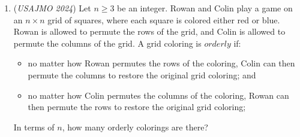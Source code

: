 \begin{enumerate}
 
Now, consider the case where there is some prime $p>2$ such that there are no even integers $m$ such that $p|a(m)$.

 Lemma $2$:

 In this case, we must have that $p|a(m)$ if $m\equiv -1 \mod p-1$ for all integers $m$.

 Proof of Lemma $2$:

 Suppose for the sake of contradiction that there exists some $m$ such that $m\equiv -1\mod p-1$ and $p$ does not divide $a(m)$. Then, we have $a(m+1)\equiv (a(m))^{m+1}-1\equiv 1-1\equiv 0\mod p$, by Fermat's Little Theorem. Since for all $p>2$, $p-1$ is even, then $m+1$ would be even. However this results in a contradiction.

 Then, we get that if $m\equiv -1\mod p-1$, then $0\equiv a(m)\equiv (a(m-1))^m-1\mod p\implies (a(m-1))^{m+1}\equiv 1\equiv a(m-1)\mod p$.

 Then, by LTE, $v_p(a(m))=v_p((a(m-1))^m-1)=v_p(a(m-1)-1)+v_p(m)>v_p(m)$. Since $\gcd(p-1,p)=1$, then $\gcd(p-1,p^k)=1$ for all positive integers $k$, so then by \href{https://artofproblemsolving.com/wiki/index.php/Chinese\_Remainder\_Theorem}{Chinese Remainder Theorem} there exists integers $m$ such that $m\equiv -1\mod p-1$ and $m\equiv 0\mod p^k$, so we are done $\square$

 
Remark: I think this is a very cool NT problem.

 
-bronzetruck2016

 


	\item (\textit{USAJMO 2024}) Let $n \ge 3$ be an integer. Rowan and Colin play a game on an $n \times n$ grid of squares, where each square is colored either red or blue. Rowan is allowed to permute the rows of the grid, and Colin is allowed to permute the columns of the grid. A grid coloring is $orderly$ if:


 
            \begin{itemize}
        \item no matter how Rowan permutes the rows of the coloring, Colin can then permute the columns to restore the original grid coloring; and
            \end{itemize}
            
            \begin{itemize}
        \item no matter how Colin permutes the columns of the coloring, Rowan can then permute the rows to restore the original grid coloring;
            \end{itemize}
            In terms of $n$, how many orderly colorings are there?



\end{enumerate}
